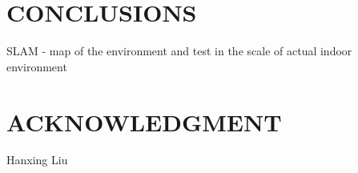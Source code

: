 \documentclass[letterpaper, 10 pt, conference]{ieeeconf}  %
\begin{document}
\section{CONCLUSIONS}


SLAM - map of the environment and test in the scale of actual indoor environment
                                  
            
\section*{ACKNOWLEDGMENT}
Hanxing Liu
\end{document}
